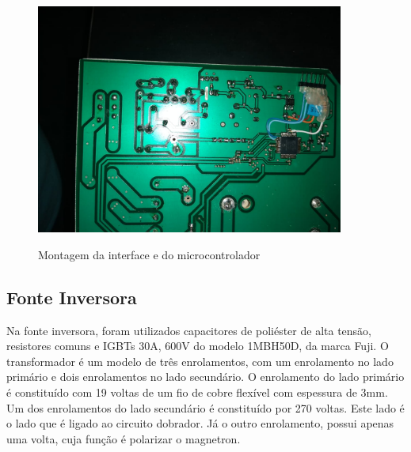 \begin{figure}[H]
    \centering
    \caption{Montagem da interface  e do microcontrolador}
    \includegraphics[width=0.9\textwidth]{./dados/figuras/placa_shunt}
    \label{fig:figura-montagem-shunt-uc}
\end{figure}

\subsection{Fonte Inversora}
Na fonte inversora, foram utilizados capacitores de poliéster de alta tensão, resistores comuns e IGBTs 30A, 600V do modelo 1MBH50D, da marca Fuji. O transformador é um modelo de três enrolamentos, com um enrolamento no lado primário e dois enrolamentos no lado secundário. O enrolamento do lado primário é constituído com 19 voltas de um fio de cobre flexível com espessura de 3mm. Um dos enrolamentos do lado secundário é constituído por 270 voltas. Este lado é o lado que é ligado ao circuito dobrador. Já o outro enrolamento, possui apenas uma volta, cuja função é polarizar o magnetron.

